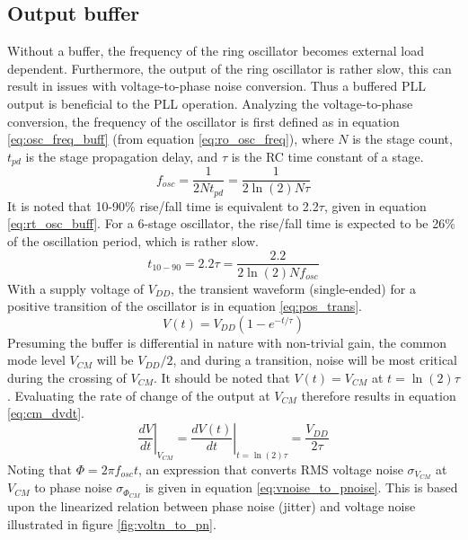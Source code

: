 	\subsection{Output buffer}
		Without a buffer, the frequency of the ring oscillator becomes external load dependent. Furthermore, the output of the ring oscillator is rather slow, this can result in issues with voltage-to-phase noise conversion. Thus a buffered PLL output is beneficial to the PLL operation. Analyzing the voltage-to-phase conversion, the frequency of the oscillator is first defined as in equation \ref{eq:osc_freq_buff} (from equation \ref{eq:ro_osc_freq}), where $N$ is the stage count, $t_{pd}$ is the stage propagation delay, and $\tau$ is the RC time constant of a stage. 
		\begin{equation}\label{eq:osc_freq_buff}
			f_{osc} = \frac{1}{2N t_{pd}} = \frac{1}{2\ln(2)N \tau}
		\end{equation}
		It is noted that 10-90\% rise/fall time is equivalent to 2.2$\tau$, given in equation \ref{eq:rt_osc_buff}. For a 6-stage oscillator, the rise/fall time is expected to be 26\% of the oscillation period, which is rather slow.
		\begin{equation}\label{eq:rt_osc_buff}
			t_{10-90} = 2.2\tau =  \frac{2.2}{2\ln(2)N f_{osc}}
		\end{equation}		
		With a supply voltage of $V_{DD}$, the transient waveform (single-ended) for a positive transition of the oscillator is in equation \ref{eq:pos_trans}.
		\begin{equation}\label{eq:pos_trans}
			V(t) =V_{DD}\left( 1 - e^{-t/\tau} \right)
		\end{equation}		
		Presuming the buffer is differential in nature with non-trivial gain, the common mode level $V_{CM}$ will be $V_{DD}/2$, and during a transition, noise will be most critical during the crossing of $V_{CM}$. It should be noted that $V(t) = V_{CM}$ at $t = \ln(2)\tau$. Evaluating the rate of change of the output at $V_{CM}$ therefore results in equation \ref{eq:cm_dvdt}.
		\begin{equation}\label{eq:cm_dvdt}
			\left.\frac{dV}{dt}\right|_{V_{CM}} = \left.\frac{dV(t)}{dt}\right|_{t= \ln(2)\tau} = \frac{V_{DD}}{2\tau}
		\end{equation}	
		Noting that $\Phi = 2\pi f_{osc}t$, an expression that converts RMS voltage noise $\sigma_{V_{CM}}$ at $V_{CM}$ to phase noise $\sigma_{\Phi_{CM}}$ is given in equation \ref{eq:vnoise_to_pnoise}. This is based upon the linearized relation between phase noise (jitter) and voltage noise illustrated in figure \ref{fig:voltn_to_pn}.
